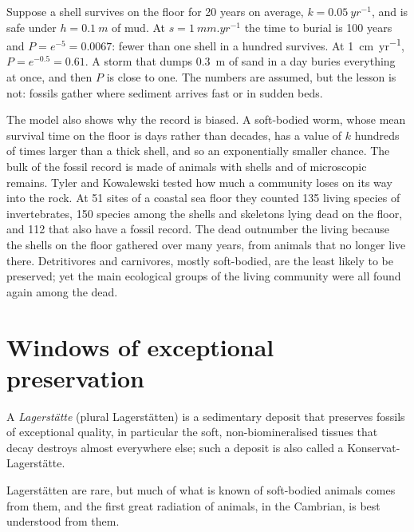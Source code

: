 \begin{example}\label{ex:b2:palaeoenvironments:shell}
Suppose a shell survives on the floor for 20 years on average, $k = \qty{0.05}{yr^{-1}}$, and is
safe under $h = \qty{0.1}{m}$ of mud. At $s = \qty{1}{mm.yr^{-1}}$ the time to burial is 100
years and $P = e^{-5} = 0.0067$: fewer than one shell in a hundred survives. At
\qty{1}{cm.yr^{-1}}, $P = e^{-0.5} = 0.61$. A storm that dumps \qty{0.3}{m} of sand in a day
buries everything at once, and then $P$ is close to one. The numbers are assumed, but the lesson
is not: fossils gather where sediment arrives fast or in sudden beds.
\end{example}

The model also shows why the record is biased. A soft-bodied worm, whose mean survival time on
the floor is days rather than decades, has a value of $k$ hundreds of times larger than a thick
shell, and so an exponentially smaller chance. The bulk of the fossil record is made of animals
with shells and of microscopic remains. Tyler and Kowalewski tested how much a community loses on
its way into the rock. At 51 sites of a coastal sea floor they counted 135 living species of
invertebrates, 150 species among the shells and skeletons lying dead on the floor, and 112 that
also have a fossil record. The dead outnumber the living because the shells on the floor gathered
over many years, from animals that no longer live there. Detritivores and carnivores, mostly
soft-bodied, are the least likely to be preserved; yet the main ecological groups of the living
community were all found again among the dead.

\section{Windows of exceptional preservation}\label{sec:b2:palaeoenvironments:lagerstatten}

\begin{definition}[Lagerstätte]\label{def:b2:palaeoenvironments:lagerstatte}
A \emph{Lagerstätte} (plural Lagerstätten) is a sedimentary deposit that
preserves fossils of exceptional quality, in particular the soft, non-biomineralised tissues that
decay destroys almost everywhere else; such a deposit is also called a Konservat-Lagerstätte.
\end{definition}

Lagerstätten are rare, but much of what is known of soft-bodied animals comes from them, and
the first great radiation of animals, in the Cambrian, is best understood from them.

